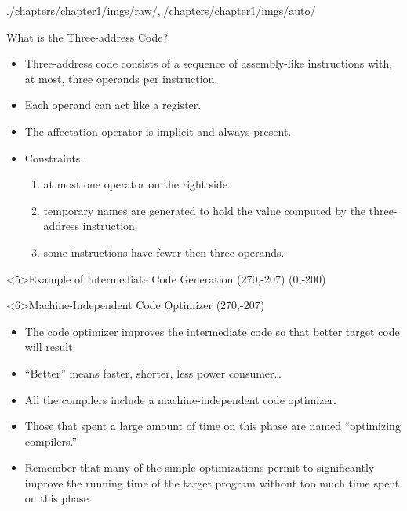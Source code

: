 \begin{graphicspathcontext}{{./chapters/chapter1/imgs/raw/},{./chapters/chapter1/imgs/auto/}}
\begin{bibunit}[apalike]
\begin{frame}{What is the Three-address Code?}
	\begin{itemize}
	\item Three-address code consists of a sequence of assembly-like instructions with, at most, three operands per instruction.
		\begin{center}
		\end{center}
	\vfill
	\item Each operand can act like a register.
	\item The affectation operator is implicit and always present.
	\vfill
	\item \alert{Constraints}: \begin{enumerate}
		\item at most one operator on the right side.
		\item temporary names are generated to hold the value computed by the three-address instruction.
		\item some instructions have fewer then three operands.
		\end{enumerate}
	\end{itemize}
\end{frame}

\begin{frame}<5>{Example of Intermediate Code Generation}
	\putat(270,-207){}
	\putat(0,-200){}
\end{frame}

\begin{frame}<6>{Machine-Independent Code Optimizer}
	\putat(270,-207){}
	\begin{minipage}{.8\linewidth}
	\begin{itemize}
	\item The code optimizer improves the intermediate code so that better target code will result.
	\item ``Better'' means faster, shorter, less power consumer\dots
	\item All the compilers include a machine-independent code optimizer.
	\item Those that spent a large amount of time on this phase are named ``optimizing compilers.''
	\item Remember that many of the simple optimizations permit to significantly improve the running time of the target program without too much time spent on this phase.
	\end{itemize}
	\end{minipage}
\end{frame}


\end{bibunit}
\end{graphicspathcontext}
